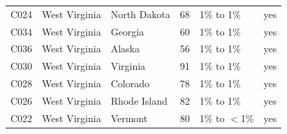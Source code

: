 \documentclass[a4paper,10pt]{article}
\newif\ifreviewmarks
\newcommand{\reviewrule}{\noindent{\color{BrickRed}\rule{\linewidth}{0.8pt}}}
\newenvironment{drafted}[1][]{%
  \ifreviewmarks\par\addvspace{\medskipamount}\reviewrule\par\nopagebreak
  \noindent{\color{BrickRed}\sffamily\footnotesize\textbf{Thesis Draft}\quad #1\hfill review}\par\nopagebreak\smallskip\fi}{%
  \ifreviewmarks\par\smallskip\noindent{\color{BrickRed}\sffamily\footnotesize end of thesis draft}\par\nopagebreak\reviewrule\par\medskip\fi}
\begin{document}
\begin{drafted}[plain-language layer: churn100-s7-c1]
{\begin{longtable}{@{}lllrlc@{}}
C024 & West Virginia & North Dakota & 68 & 1\% to 1\% & \textcolor{OliveGreen}{yes} \\
C034 & West Virginia & Georgia & 60 & 1\% to 1\% & \textcolor{OliveGreen}{yes} \\
C036 & West Virginia & Alaska & 56 & 1\% to 1\% & \textcolor{OliveGreen}{yes} \\
C030 & West Virginia & Virginia & 91 & 1\% to 1\% & \textcolor{OliveGreen}{yes} \\
C028 & West Virginia & Colorado & 78 & 1\% to 1\% & \textcolor{OliveGreen}{yes} \\
C026 & West Virginia & Rhode Island & 82 & 1\% to 1\% & \textcolor{OliveGreen}{yes} \\
C022 & West Virginia & Vermont & 80 & 1\% to $<$1\% & \textcolor{OliveGreen}{yes} \\
\end{longtable}}

\end{drafted}
\end{document}
